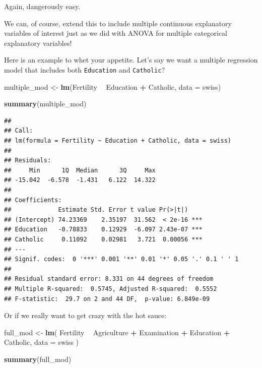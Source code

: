 \documentclass[
]{book}
\newenvironment{Shaded}{\begin{snugshade}}{\end{snugshade}}
\newcommand{\DataTypeTok}[1]{\textcolor[rgb]{0.13,0.29,0.53}{#1}}
\newcommand{\KeywordTok}[1]{\textcolor[rgb]{0.13,0.29,0.53}{\textbf{#1}}}
\newcommand{\NormalTok}[1]{#1}
\newcommand{\OperatorTok}[1]{\textcolor[rgb]{0.81,0.36,0.00}{\textbf{#1}}}
\newcommand{\StringTok}[1]{\textcolor[rgb]{0.31,0.60,0.02}{#1}}
\begin{document}
Again, dangerously easy.

We can, of course, extend this to include multiple continuous explanatory variables of interest just as we did with ANOVA for multiple categorical explanatory variables!

Here is an example to whet your appetite. Let's say we want a multiple regression model that includes both \texttt{Education} and \texttt{Catholic}?

\begin{Shaded}
\begin{Highlighting}[]
\NormalTok{multiple_mod <-}\StringTok{ }\KeywordTok{lm}\NormalTok{(Fertility }\OperatorTok{~}\StringTok{ }\NormalTok{Education }\OperatorTok{+}\StringTok{ }\NormalTok{Catholic, }\DataTypeTok{data =}\NormalTok{ swiss)}

\KeywordTok{summary}\NormalTok{(multiple_mod)}
\end{Highlighting}
\end{Shaded}

\begin{verbatim}
## 
## Call:
## lm(formula = Fertility ~ Education + Catholic, data = swiss)
## 
## Residuals:
##     Min      1Q  Median      3Q     Max 
## -15.042  -6.578  -1.431   6.122  14.322 
## 
## Coefficients:
##             Estimate Std. Error t value Pr(>|t|)    
## (Intercept) 74.23369    2.35197  31.562  < 2e-16 ***
## Education   -0.78833    0.12929  -6.097 2.43e-07 ***
## Catholic     0.11092    0.02981   3.721  0.00056 ***
## ---
## Signif. codes:  0 '***' 0.001 '**' 0.01 '*' 0.05 '.' 0.1 ' ' 1
## 
## Residual standard error: 8.331 on 44 degrees of freedom
## Multiple R-squared:  0.5745,	Adjusted R-squared:  0.5552 
## F-statistic:  29.7 on 2 and 44 DF,  p-value: 6.849e-09
\end{verbatim}

Or if we really want to get crazy with the hot sauce:

\begin{Shaded}
\begin{Highlighting}[]
\NormalTok{full_mod <-}\StringTok{ }\KeywordTok{lm}\NormalTok{(}
\NormalTok{  Fertility }\OperatorTok{~}\StringTok{ }\NormalTok{Agriculture }\OperatorTok{+}\StringTok{ }\NormalTok{Examination }\OperatorTok{+}\StringTok{ }\NormalTok{Education }\OperatorTok{+}\StringTok{ }\NormalTok{Catholic,}
  \DataTypeTok{data =}\NormalTok{ swiss}
\NormalTok{  )}

\KeywordTok{summary}\NormalTok{(full_mod)}
\end{Highlighting}
\end{Shaded}
\end{document}
